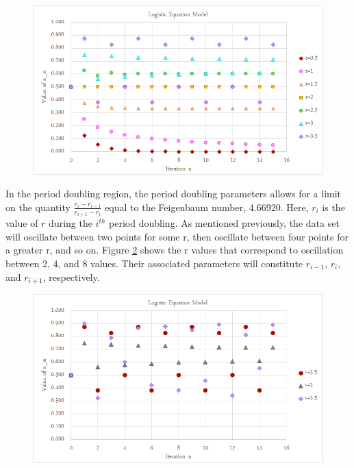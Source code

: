 \documentclass[a4paper]{article}
\begin{document}
\begin{figure}[H]
\centering
\includegraphics[width=1\textwidth]{pdoub.png}
\label{pdoub1}
\end{figure}

In the period doubling region, the period doubling parameters allows for a limit on the quantity $\frac{r_i - r_{i-1}}{r_{i+1} - r_i}$ equal to the Feigenbaum number, 4.66920. Here, $r_i$ is the value of $r$ during the $i^{th}$ period doubling. As mentioned previously, the data set will oscillate between two points for some r, then oscillate between four points for a greater r, and so on. Figure \ref{fein} shows the r values that correspond to oscillation between 2, 4, and 8 values. Their associated parameters will constitute $r_{i-1}$, $r_i$, and $r_{i+1}$, respectively.

\begin{figure}[H]
\centering
\includegraphics[width=1\textwidth]{fein.png}
\label{fein}
\end{figure}
\end{document}
